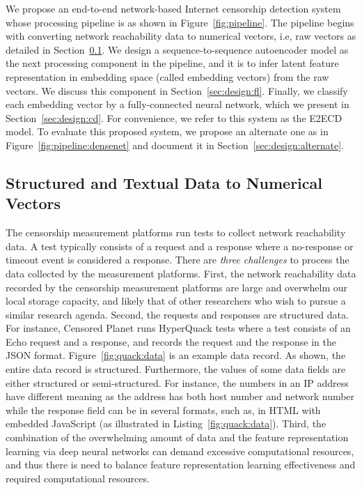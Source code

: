 We propose an end-to-end network-based Internet censorship detection system 
whose processing pipeline is 
as shown in Figure~\ref{fig:pipeline}. The pipeline begins with converting
network reachability data to numerical vectors, i.e, raw vectors as detailed in
Section~\ref{sec:design:vector}.  We design a sequence-to-sequence autoencoder
model as the next processing component in the pipeline, and it is to infer
latent feature representation in embedding space (called embedding vectors)
from the raw vectors. We discuss this component in Section~\ref{sec:design:fl}.
Finally, we classify each embedding vector by a fully-connected neural
network, which we present in Section~\ref{sec:design:cd}. For
convenience, we refer to this system as the E2ECD model. To evaluate this
proposed system, we propose an alternate one as in
Figure~\ref{fig:pipeline:densenet} and document it in
Section~\ref{sec:design:alternate}.





\subsection{Structured and Textual Data to Numerical Vectors}
\label{sec:design:vector}

The censorship measurement platforms run tests to collect network reachability
data. A test typically consists of a request and a response where a no-response
or timeout event is considered a response. There are {\em three challenges} to process
the data collected by the measurement platforms.  First, the network
reachability data recorded by the censorship measurement platforms are
large and overwhelm our local storage capacity, and likely that of other
researchers who wish to pursue a similar research agenda.  Second, the requests
and responses are structured data. For instance, Censored Planet runs HyperQuack
tests where a test consists of an Echo request and a response, and records the
request and the response in the JSON format. Figure~\ref{fig:quack:data} is an
example data record. As shown, the entire data record is structured.
Furthermore, the values of some data fields are either structured or
semi-structured. For instance, the numbers in an IP address have different
meaning as the address has both host number and network number while the
response field can be in several formats, such as, in HTML with embedded
JavaScript (as illustrated in Listing~\ref{fig:quack:data}). 
Third, the combination of the overwhelming amount of data and the feature 
representation learning via deep neural networks can demand excessive computational resources, and thus there is need to balance feature representation learning effectiveness and required computational resources. 


